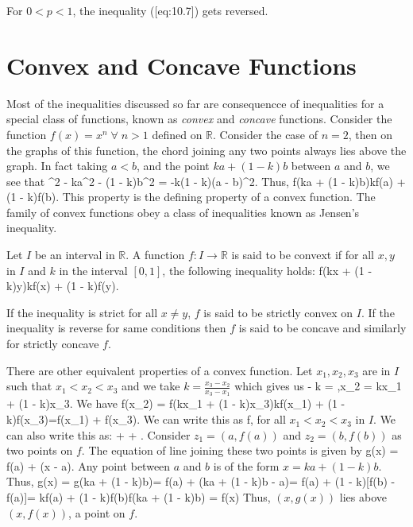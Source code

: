 \startremark
\stopremark For $0<p<1$, the inequality ([eq:10.7]) gets reversed.

\section{Convex and Concave Functions}
Most of the inequalities discussed so far are consequencce of inequalities for a special class of functions, known as
{\it convex} and {\it concave} functions. Consider the function $f(x) = x^n\;\forall\;n>1$ defined on $\mathbb{R}$. Consider
the case of $n=2$, then on the graphs of this function, the chord joining any two points always lies above the graph. In fact
taking $a<b$, and the point $ka + (1 - k)b$ between $a$ and $b$, we see that
\startformula [ka + (1 - k)b]^2 - ka^2 - (1 - k)b^2 = -k(1 - k)(a - b)^2.\stopformula
Thus,
\startformula f(ka + (1 - k)b)\leq kf(a) + (1 - k)f(b).\stopformula
This property is the defining property of a convex function. The family of convex functions obey a class of inequalities known as
Jensen's inequality.

Let $I$ be an interval in $\mathbb{R}$. A function $f:I\rightarrow\mathbb{R}$ is said to be convext if for all $x, y$ in $I$ and
$k$ in the interval $[0, 1]$, the following inequality holds:
\placeformula[eq:convex]\startformula
  f(kx + (1 - k)y)\leq kf(x) + (1 - k)f(y).
\stopformula

If the inequality is strict for all $x\neq y$, $f$ is said to be strictly convex on $I$. If the inequality is reverse for same
conditions then $f$ is said to be concave and similarly for strictly concave $f$.

There are other equivalent properties of a convex function. Let $x_1, x_2, x_3$ are in $I$ such that $x_1<x_2<x_3$ and we take $k =
\frac{x_3 - x_2}{x_3 - x_1}$ which gives us
 - k = ,\;\;x_2 = kx_1 + (1 - k)x_3.\stopformula
We have \startformula \startalign\NC f(x_2) \NC= f(kx_1 + (1 - k)x_3)\NR\NC\NC\leq kf(x_1) + (1 - k)f(x_3)\NR\NC\NC=f(x_1) +
  f(x_3).\stopalign\stopformula
We can write this as \startformula f\leq{},\stopformula
for all $x_1<x_2<x_3$ in $I$. We can also write this as:
\startformula {} +  + .\stopformula
Consider $z_1 = (a, f(a))$ and $z_2 = (b, f(b))$ as two points on $f$. The equation of line joining these two points is given by
\startformula g(x) = f(a) + (x - a).\stopformula
Any point between $a$ and $b$ is of the form $x = ka + (1 - k)b$. Thus,
\startformula \startalign\NC g(x) \NC = g(ka + (1 - k)b)\NR\NC\NC = f(a) + (ka + (1 - k)b - a)\NR\NC\NC = f(a) + (1 - k)[f(b) -
    f(a)]\NR\NC\NC = kf(a) + (1 - k)f(b)\NR\NC\NC \geq f(ka + (1 - k)b) = f(x)\stopalign\stopformula
Thus, $(x, g(x))$ lies above $(x, f(x))$, a point on $f$.

